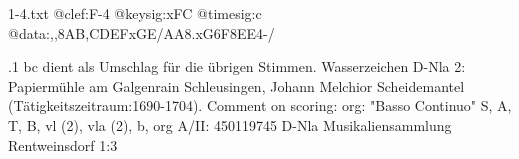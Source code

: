\documentclass[twocolumn]{book}
\begin{document}
\newline
\begin{filecontents*}{1-4.txt}
@clef:F-4
@keysig:xFC
@timesig:c
@data:,,8{AB},{CD}{EF}xGE/AA8.xG6F8EE4-/
\end{filecontents*}
\immediate{}
%
.1
\newline bc dient als Umschlag für die übrigen Stimmen.
\newline Wasserzeichen D-Nla 2: Papiermühle am Galgenrain Schleusingen, Johann Melchior Scheidemantel (Tätigkeitszeitraum:1690-1704).
\newline Comment on scoring: org: "Basso Continuo"
\newline S, A, T, B, vl (2), vla (2), b, org
\newline A/II: 450119745
\newline D-Nla Musikaliensammlung Rentweinsdorf 1:3
\newline 
\end{document}
